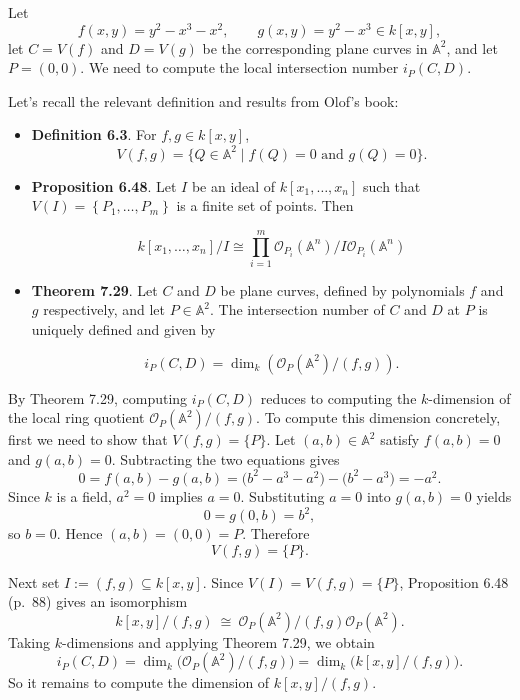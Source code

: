 \documentclass[a4paper,12pt,openany]{article}
\theoremstyle{plain}
\theoremstyle{definition}
\theoremstyle{remark}
\begin{document}
Let
\[
f(x,y)=y^{2}-x^{3}-x^{2},\qquad g(x,y)=y^{2}-x^{3}\in k[x,y],
\]
let $C=V(f)$ and $D=V(g)$ be the corresponding plane curves in $\mathbb{A}^{2}$, and let $P=(0,0)$.
We need to compute the local intersection number $i_{P}(C,D)$.

\medskip

Let's recall the relevant definition and results from Olof's book:
\begin{itemize}
    \item \textbf{Definition 6.3}. For $f,g\in k[x,y]$,
    \[
    V(f,g)=\{Q\in \mathbb{A}^2 \mid f(Q)=0 \text{ and } g(Q)=0\}.
    \]
    \item \textbf{Proposition 6.48}. Let $I$ be an ideal of $k\left[x_1, \ldots, x_n\right]$ such that $V(I)= \left\{P_1, \ldots, P_m\right\}$ is a finite set of points. Then

$$
k\left[x_1, \ldots, x_n\right] / I \cong \prod_{i=1}^m \mathcal{O}_{P_i}\left(\mathbb{A}^n\right) / I \mathcal{O}_{P_i}\left(\mathbb{A}^n\right)
$$
    \item \textbf{Theorem 7.29}. Let $C$ and $D$ be plane curves, defined by polynomials $f$ and $g$ respectively, and let $P \in \mathbb{A}^2$. The intersection number of $C$ and $D$ at $P$ is uniquely defined and given by

$$
i_P(C, D)=\operatorname{dim}_k\left(\mathcal{O}_P\left(\mathbb{A}^2\right) /(f, g)\right) .
$$
\end{itemize}

\medskip


By Theorem 7.29, computing $i_{P}(C,D)$ reduces to computing the $k$-dimension of the local ring quotient
$\mathcal{O}_{P}(\mathbb{A}^{2})/(f,g)$.  
To compute this dimension concretely, first we need to show that $V(f,g)=\{P\}$.
Let $(a,b)\in \mathbb{A}^{2}$ satisfy $f(a,b)=0$ and $g(a,b)=0$. Subtracting the two equations gives
\[
0=f(a,b)-g(a,b)=\bigl(b^{2}-a^{3}-a^{2}\bigr)-\bigl(b^{2}-a^{3}\bigr)=-a^{2}.
\]
Since $k$ is a field, $a^{2}=0$ implies $a=0$. Substituting $a=0$ into $g(a,b)=0$ yields
\[
0=g(0,b)=b^{2},
\]
so $b=0$. Hence $(a,b)=(0,0)=P$. Therefore
\[
V(f,g)=\{P\}.
\]

\medskip

Next set $I:=(f,g)\subseteq k[x,y]$. Since $V(I)=V(f,g)=\{P\}$, Proposition 6.48 (p.~88) gives an isomorphism
\[
k[x,y]/(f,g)\ \cong\ \mathcal{O}_{P}(\mathbb{A}^{2})/(f,g)\mathcal{O}_{P}(\mathbb{A}^{2}).
\]
Taking $k$-dimensions and applying Theorem 7.29, we obtain
\[
i_{P}(C,D)=\dim_{k}\!\bigl(\mathcal{O}_{P}(\mathbb{A}^{2})/(f,g)\bigr)
=\dim_{k}\!\bigl(k[x,y]/(f,g)\bigr).
\]
So it remains to compute the dimension of $k[x,y]/(f,g)$.
\end{document}
